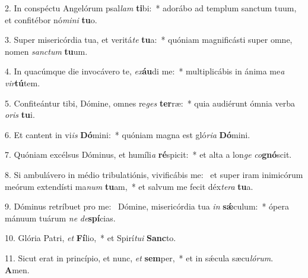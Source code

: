 2. In conspéctu Angelórum psal\textit{lam} \textbf{ti}bi:~*  adorábo ad templum sanctum tuum, et confitébor nó\textit{mi}\textit{ni} \textbf{tu}o.\

3. Super misericórdia tua, et veritá\textit{te} \textbf{tu}a:~*  quóniam magnificásti super omne, nomen \textit{sanc}\textit{tum} \textbf{tu}um.\

4. In quacúmque die invocávero te, \textit{ex}\textbf{áu}di me:~*  multiplicábis in ánima me\textit{a} \textit{vir}\textbf{tú}tem.\

5. Confiteántur tibi, Dómine, omnes re\textit{ges} \textbf{ter}ræ:~*  quia audiérunt ómnia verba \textit{o}\textit{ris} \textbf{tu}i.\

6. Et cantent in vi\textit{is} \textbf{Dó}mini:~*  quóniam magna est gló\textit{ri}\textit{a} \textbf{Dó}mini.\

7. Quóniam excélsus Dóminus, et humíli\textit{a} \textbf{ré}spicit:~*  et alta a lon\textit{ge} \textit{co}\textbf{gnó}scit.\

8. Si ambulávero in médio tribulatiónis, vivificábis me: \dag\  et super iram inimicórum meórum extendísti ma\textit{num} \textbf{tu}am,~*  et salvum me fecit déx\textit{te}\textit{ra} \textbf{tu}a.\

9. Dóminus retríbuet pro me: \dag\  Dómine, misericórdia tua \textit{in} \textbf{sǽ}culum:~*  ópera mánuum tuárum \textit{ne} \textit{de}\textbf{spí}cias.\

10. Glória Patri, \textit{et} \textbf{Fí}lio,~*  et Spirí\textit{tu}\textit{i} \textbf{Sanc}to.\

11. Sicut erat in princípio, et nunc, \textit{et} \textbf{sem}per,~*  et in sǽcula sæcu\textit{ló}\textit{rum}. \textbf{A}men.\

